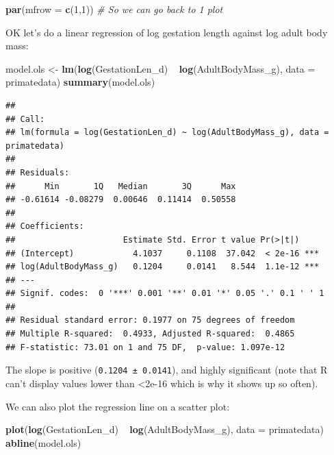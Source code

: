 \documentclass[]{book}
\newenvironment{Shaded}{\begin{snugshade}}{\end{snugshade}}
\newcommand{\KeywordTok}[1]{\textcolor[rgb]{0.13,0.29,0.53}{\textbf{{#1}}}}
\newcommand{\DataTypeTok}[1]{\textcolor[rgb]{0.13,0.29,0.53}{{#1}}}
\newcommand{\DecValTok}[1]{\textcolor[rgb]{0.00,0.00,0.81}{{#1}}}
\newcommand{\StringTok}[1]{\textcolor[rgb]{0.31,0.60,0.02}{{#1}}}
\newcommand{\CommentTok}[1]{\textcolor[rgb]{0.56,0.35,0.01}{\textit{{#1}}}}
\newcommand{\NormalTok}[1]{{#1}}
\theoremstyle{definition}
\theoremstyle{definition}
\theoremstyle{definition}
\theoremstyle{remark}
\begin{document}
\begin{Shaded}
\begin{Highlighting}[]
\KeywordTok{par}\NormalTok{(}\DataTypeTok{mfrow =} \KeywordTok{c}\NormalTok{(}\DecValTok{1}\NormalTok{,}\DecValTok{1}\NormalTok{)) }\CommentTok{# So we can go back to 1 plot}
\end{Highlighting}
\end{Shaded}

OK let's do a linear regression of log gestation length against log
adult body mass:

\begin{Shaded}
\begin{Highlighting}[]
\NormalTok{model.ols <-}\StringTok{ }\KeywordTok{lm}\NormalTok{(}\KeywordTok{log}\NormalTok{(GestationLen_d) ~}\StringTok{ }\KeywordTok{log}\NormalTok{(AdultBodyMass_g), }\DataTypeTok{data =} \NormalTok{primatedata)}
\KeywordTok{summary}\NormalTok{(model.ols)}
\end{Highlighting}
\end{Shaded}

\begin{verbatim}
## 
## Call:
## lm(formula = log(GestationLen_d) ~ log(AdultBodyMass_g), data = primatedata)
## 
## Residuals:
##      Min       1Q   Median       3Q      Max 
## -0.61614 -0.08279  0.00646  0.11414  0.50558 
## 
## Coefficients:
##                      Estimate Std. Error t value Pr(>|t|)    
## (Intercept)            4.1037     0.1108  37.042  < 2e-16 ***
## log(AdultBodyMass_g)   0.1204     0.0141   8.544  1.1e-12 ***
## ---
## Signif. codes:  0 '***' 0.001 '**' 0.01 '*' 0.05 '.' 0.1 ' ' 1
## 
## Residual standard error: 0.1977 on 75 degrees of freedom
## Multiple R-squared:  0.4933, Adjusted R-squared:  0.4865 
## F-statistic: 73.01 on 1 and 75 DF,  p-value: 1.097e-12
\end{verbatim}

The slope is positive (\texttt{0.1204\ ±\ 0.0141}), and highly
significant (note that R can't display values lower than
\textless{}2e-16 which is why it shows up so often).

We can also plot the regression line on a scatter plot:

\begin{Shaded}
\begin{Highlighting}[]
\KeywordTok{plot}\NormalTok{(}\KeywordTok{log}\NormalTok{(GestationLen_d) ~}\StringTok{ }\KeywordTok{log}\NormalTok{(AdultBodyMass_g), }\DataTypeTok{data =} \NormalTok{primatedata)}
\KeywordTok{abline}\NormalTok{(model.ols)}
\end{Highlighting}
\end{Shaded}
\end{document}
